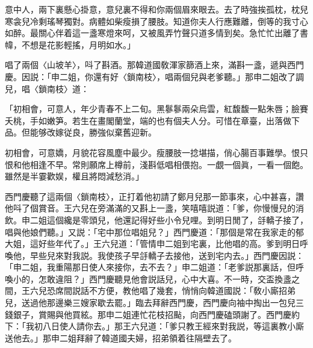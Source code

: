 意中人，兩下裏懸心掛意，意兒裏不得和你兩個眉來眼去。去了時強挨孤枕，枕兒寒衾兒冷剩瑤琴獨對。病體如柴瘦損了腰肢。知道你夫人行應難離，倒等的我寸心如醉。最關心伴着這一盞寒燈來呵，又被風弄竹聲只道多情到矣。急忙忙出離了書幃，不想是花影輕搖，月明如水。」

唱了兩個〈山坡羊〉，呌了斟酒。那韓道國敎渾家篩酒上來，滿斟一盞，遞與西門慶。因説：「申二姐，你還有好〈鎖南枝〉，唱兩個兒與老爹聽。」那申二姐改了調兒，唱〈鎖南枝〉道：

「初相會，可意人，年少青春不上二旬。黑鬖鬖兩朵烏雲，紅馥馥一點朱唇；臉賽夭桃，手如嫩笋。若生在畫閣蘭堂，端的也有個夫人分。可惜在章臺，出落做下品。但能够改嫁従良，勝強似棄舊迎新。

初相會，可意嬌，月貌花容風塵中最少。瘦腰肢一捻堪描，俏心腸百事難學。恨只恨和他相逢不早。常則願席上樽前，淺斟低唱相偎抱。一覷一個眞，一看一個飽。雖然是半霎歡娱，權且將悶減愁消。」

西門慶聽了這兩個〈鎖南枝〉，正打着他初請了鄭月兒那一節事來，心中甚喜，讚他呌了個賞音。王六兒在旁滿滿的又斟上一盞，笑嘻嘻説道：「爹，你慢慢兒的消飲。申二姐這個纔是零頭兒，他還記得好些小令兒哩。到明日閒了，㧱轎子接了，唱與他娘們聽。」又説：「宅中那位唱姐兒？」西門慶道：「那個是常在我家走的郁大姐，這好些年代了。」王六兒道：「管情申二姐到宅裏，比他唱的高。爹到明日呼喚他，早些兒來對我説。我使孩子早㧱轎子去接他，送到宅内去。」西門慶因説：「申二姐，我重陽那日使人來接你，去不去？」申二姐道：「老爹説那裏話，但呼喚小的，怎敢違阻？」西門慶聽見他會説話兒，心中大喜。不一時，交盃換盞之間，王六兒恐席間説話不方便，教他唱了幾套，悄悄向韓道國説：「敎小廝招弟兒，送過他那邊樂三嫂家歇去罷。」臨去拜辭西門慶，西門慶向袖中掏出一包兒三錢銀子，賞賜與他買絃。那申二姐連忙花枝招颭，向西門慶磕頭謝了。西門慶約下：「我初八日使人請你去。」那王六兒道：「爹只教王經來對我説，等這裏教小廝送他去。」那申二姐拜辭了韓道國夫婦，招弟領着往隔壁去了。

